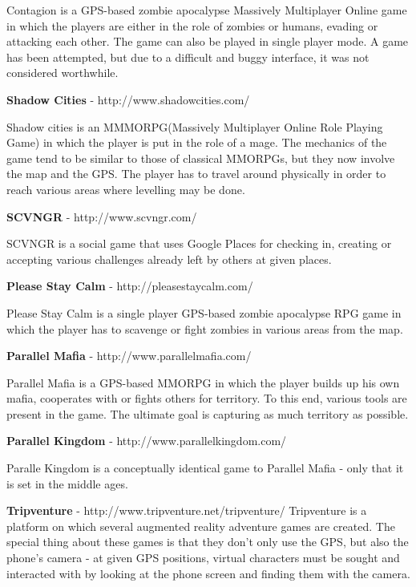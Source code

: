 \documentclass{article}
\begin{document}
Contagion is a GPS-based zombie apocalypse Massively Multiplayer Online game in
which the players are either in the role of zombies or humans, evading or
attacking each other. The game can also be played in single player mode. A game
has been attempted, but due to a difficult and buggy interface, it was
not considered worthwhile.\newline

\textbf{Shadow Cities} - http://www.shadowcities.com/\newline
 
Shadow cities is an MMMORPG(Massively Multiplayer Online Role Playing Game) in
which the player is put in the role of a mage. The mechanics of the game tend to
be similar to those of classical MMORPGs, but they now involve the map and the
GPS. The player has to travel around physically in order to reach various areas
where levelling may be done.\newline

\textbf{SCVNGR} - http://www.scvngr.com/\newline

SCVNGR is a social game that uses Google Places for checking in, creating or
accepting various challenges already left by others at given places.\newline

\textbf{Please Stay Calm} - http://pleasestaycalm.com/ \newline

Please Stay Calm is a single player GPS-based zombie apocalypse RPG game in
which the player has to scavenge or fight zombies in various areas from the
map.\newline


\textbf{Parallel Mafia} - http://www.parallelmafia.com/ \newline

Parallel Mafia is a GPS-based MMORPG in which the player builds up his own
mafia, cooperates with or fights others for territory. To this end, various tools
are present in the game. The ultimate goal is capturing as much territory as
possible.\newline

\textbf{Parallel Kingdom} - http://www.parallelkingdom.com/ \newline

Paralle Kingdom is a conceptually identical game to Parallel Mafia - only that
it is set in the middle ages.\newline

\textbf{Tripventure} - http://www.tripventure.net/tripventure/ \newline
Tripventure is a platform on which several augmented reality adventure games are
created. The special thing about these games is that they don't only use the
GPS, but also the phone's camera - at given GPS positions, virtual characters
must be sought and interacted with by looking at the phone screen and finding
them with the camera.\newline
\end{document}
